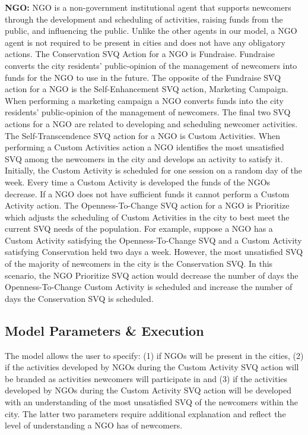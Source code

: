 \documentclass{scspaperproc}
\theoremstyle{scsthe}
\begin{document}
{\bf NGO:} NGO is a non-government institutional agent that supports newcomers through the development and scheduling of activities, raising funds from the public, and influencing the public. Unlike the other agents in our model, a NGO agent is not required to be present in cities and does not have any obligatory actions. The Conservation SVQ Action for a NGO is Fundraise. Fundraise converts the city residents' public-opinion of the management of newcomers into funds for the NGO to use in the future. The opposite of the Fundraise SVQ action for a NGO is the Self-Enhancement SVQ action, Marketing Campaign. When performing a marketing campaign a NGO converts funds into the city residents' public-opinion of the management of newcomers. The final two SVQ actions for a NGO are related to developing and scheduling newcomer activities. The Self-Transcendence SVQ action for a NGO is Custom Activities. When performing a Custom Activities action a NGO identifies the most unsatisfied SVQ among the newcomers in the city and develops an activity to satisfy it. Initially, the Custom Activity is scheduled for one session on a random day of the week. Every time a Custom Activity is developed the funds of the NGOs decrease. If a NGO does not have sufficient funds it cannot perform a Custom Activity action. The Openness-To-Change SVQ action for a NGO is Prioritize which adjusts the scheduling of Custom Activities in the city to best meet the current SVQ needs of the population. For example, suppose a NGO has a Custom Activity satisfying the Openness-To-Change SVQ and a Custom Activity satisfying Conservation held two days a week. However, the most unsatisfied SVQ of the majority of newcomers in the city is the Conservation SVQ. In this scenario, the NGO Prioritize SVQ action would decrease the number of days the Openness-To-Change Custom Activity is scheduled and increase the number of days the Conservation SVQ is scheduled.

\subsection{Model Parameters \& Execution}
The model allows the user to specify: (1) if NGOs will be present in the cities, (2) if the activities developed by NGOs during the Custom Activity SVQ action will be branded as activities newcomers will participate in and (3) if the activities developed by NGOs during the Custom Activity SVQ action will be developed with an understanding of the most unsatisfied SVQ of the newcomers within the city. The latter two parameters require additional explanation and reflect the level of understanding a NGO has of newcomers. 
\end{document}
